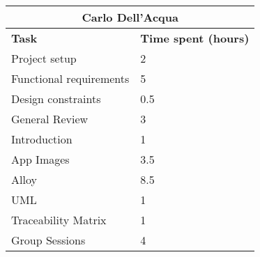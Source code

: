 \begin{table}[H]
  \centering
  \begin{tabular}{l|l}
    \multicolumn{2}{c}{\textbf{Carlo Dell'Acqua}} \\
    \hline
    \textbf{Task} & \textbf{Time spent (hours)}\\
    \hline
    Project setup & 2 \\
    Functional requirements & 5 \\
    Design constraints & 0.5 \\
    General Review & 3 \\
    Introduction & 1 \\
    App Images & 3.5 \\
    Alloy & 8.5 \\
    UML & 1 \\
    Traceability Matrix & 1 \\
    Group Sessions & 4 \\
  \end{tabular}
\end{table}